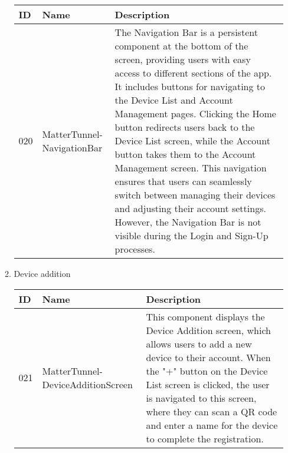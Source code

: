 \documentclass[conference]{IEEEtran}
\begin{document}
\begin{enumerate}[itemsep=2ex, parsep=1ex]
\begin{enumerate}[itemsep=2ex, parsep=1ex]
	      	      \begin{table}[h!]
	      	      	\def\arraystretch{1.24} \small
	      	      	\begin{tabular}{|p{1.2cm}|p{2.5cm}|p{4.0cm}|}
	      	      		\hline
	      	      		ID  & Name                       & Description                                                                                                                                                                                                                                                                                                                                                                                                                                                                                                                                                                                      \\
	      	      		\hline
	      	      		020 & MatterTunnel-NavigationBar & The Navigation Bar is a persistent component at the bottom of the screen, providing users with easy access to different sections of the app. It includes buttons for navigating to the Device List and Account Management pages. Clicking the Home button redirects users back to the Device List screen, while the Account button takes them to the Account Management screen. This navigation ensures that users can seamlessly switch between managing their devices and adjusting their account settings. However, the Navigation Bar is not visible during the Login and Sign-Up processes. \\
	      	      		\hline
	      	      	\end{tabular}
	      	      \end{table}
	      	      
	      	\item Device addition
	      	      \begin{table}[h!]
	      	      	\def\arraystretch{1.24} \small
	      	      	\begin{tabular}{|p{1.2cm}|p{2.5cm}|p{4.0cm}|}
	      	      		\hline
	      	      		ID  & Name                              & Description                                                                                                                                                                                                                                                                                              \\
	      	      		\hline
	      	      		021 & MatterTunnel-DeviceAdditionScreen & This component displays the Device Addition screen, which allows users to add a new device to their account. When the "+" button on the Device List screen is clicked, the user is navigated to this screen, where they can scan a QR code and enter a name for the device to complete the registration. \\
	      	      		\hline
	      	      	\end{tabular}
	      	      \end{table}
	      	      

\end{enumerate}
\end{enumerate}
\end{document}
